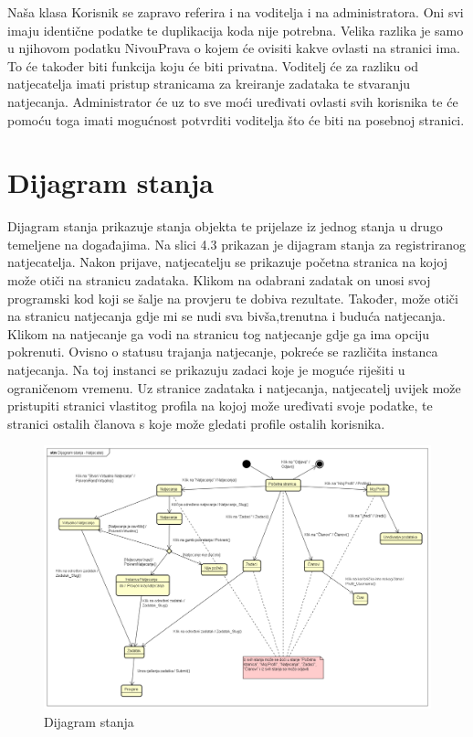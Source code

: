 			Naša klasa Korisnik se zapravo referira i na voditelja i na administratora. Oni svi imaju identične podatke te duplikacija koda
			nije potrebna. Velika razlika je samo u njihovom podatku NivouPrava o kojem će ovisiti kakve ovlasti na stranici ima.
			To će također biti funkcija koju će biti privatna. Voditelj će za razliku od natjecatelja imati pristup stranicama
			za  kreiranje zadataka te stvaranju natjecanja. Administrator će uz to sve moći uređivati ovlasti svih korisnika te će pomoću toga imati mogućnost potvrditi voditelja što će biti na posebnoj stranici.



			
			
			
			\eject
		
		\section{Dijagram stanja}
			
		
			Dijagram stanja prikazuje stanja objekta te prijelaze iz jednog stanja u drugo temeljene na događajima. Na slici 4.3 prikazan je dijagram stanja za registriranog natjecatelja. Nakon prijave, natjecatelju se prikazuje početna stranica na kojoj može otiči na stranicu zadataka. Klikom na odabrani zadatak on unosi svoj programski kod koji se šalje na provjeru te dobiva rezultate. Također, može otiči na stranicu natjecanja gdje mi se nudi sva bivša,trenutna i buduća natjecanja. Klikom na natjecanje ga vodi na stranicu tog natjecanje gdje ga ima opciju pokrenuti. Ovisno o statusu trajanja natjecanje, pokreće se različita instanca natjecanja. Na toj instanci se prikazuju zadaci koje je moguće riješiti u ograničenom vremenu. Uz stranice zadataka i natjecanja, natjecatelj uvijek može pristupiti stranici vlastitog profila na kojoj može uređivati svoje podatke, te stranici ostalih članova s koje može gledati profile ostalih korisnika. 
			
			\begin{figure}[H]
				\includegraphics[width=\textwidth]{slike/DijagramStanja.png} %
				\caption{Dijagram stanja}
				\label{fig:DijagramStanja} %
			\end{figure}
			
